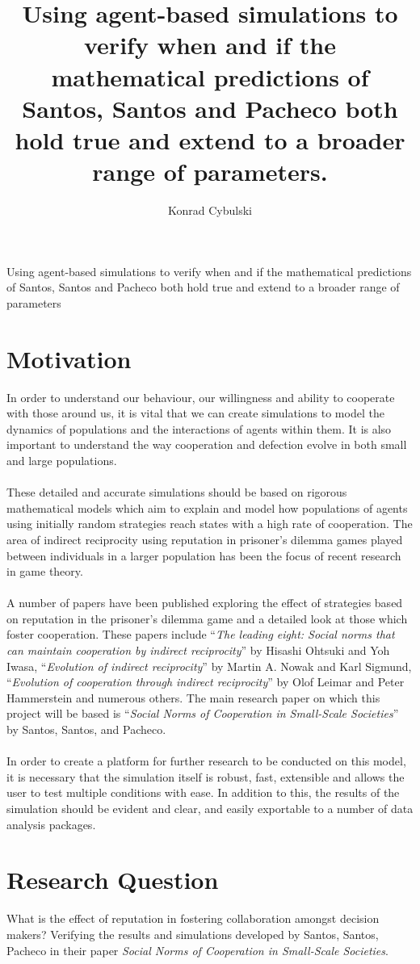 \documentclass[10pt,a4paper]{article}
\author{Konrad Cybulski}
\title{Using agent-based simulations to verify when and if the mathematical
predictions of Santos, Santos and Pacheco both hold true and extend to a broader
range of parameters.}
\begin{document}
\begin{Large}
Using agent-based simulations to verify when and if the mathematical predictions of
Santos, Santos and Pacheco both hold true and extend to a broader range of parameters
\end{Large}
\section{Motivation}
In order to understand our behaviour, our willingness and ability to cooperate with those around us, it is vital that we can create simulations to model the dynamics of populations and the interactions of agents within them. It is also important to understand the way cooperation and defection evolve in both small and large populations. \\\\
These detailed and accurate simulations should be based on rigorous mathematical models which aim to explain and model how populations of agents using initially random strategies reach states with a high rate of cooperation. The area of indirect reciprocity using reputation in prisoner’s dilemma games played between individuals in a larger population has been the focus of recent research in game theory. \\\\
A number of papers have been published exploring the effect of strategies based on reputation in the prisoner’s dilemma game and a detailed look at those which foster cooperation. These papers include “\textit{The leading eight: Social norms that can maintain cooperation by indirect reciprocity}” by Hisashi Ohtsuki and Yoh Iwasa, “\textit{Evolution of indirect reciprocity}” by Martin A. Nowak and Karl Sigmund, “\textit{Evolution of cooperation through indirect reciprocity}” by Olof Leimar and Peter Hammerstein and numerous others. The main research paper on which this project will be based is “\textit{Social Norms of Cooperation in Small-Scale Societies}” by Santos, Santos, and Pacheco. \\\\
In order to create a platform for further research to be conducted on this model, it is necessary that the simulation itself is robust, fast, extensible and allows the user to test multiple conditions with ease. In addition to this, the results of the simulation should be evident and clear, and easily exportable to a number of data analysis packages. 
\section{Research Question}
What is the effect of reputation in fostering collaboration amongst decision makers? Verifying the results and simulations developed by Santos, Santos, Pacheco in their paper \textit{Social Norms of Cooperation in Small-Scale Societies}. 
\end{document}
